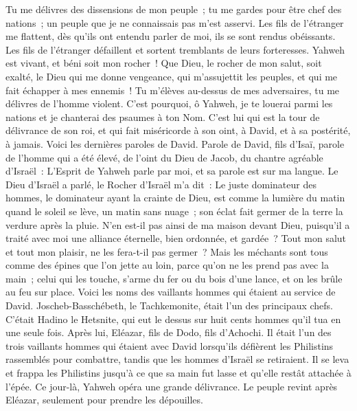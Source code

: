 \begin{multicols}{2}
Tu me délivres des dissensions de mon peuple~; tu me gardes pour être chef des nations~; un peuple que je ne connaissais pas m'est asservi.
Les fils de l'étranger me flattent, dès qu'ils ont entendu parler de moi, ils se sont rendus obéissants.
Les fils de l'étranger défaillent et sortent tremblants de leurs forteresses.
Yahweh est vivant, et béni soit mon rocher~! Que Dieu, le rocher de mon salut, soit exalté,
le Dieu qui me donne vengeance, qui m'assujettit les peuples,
et qui me fait échapper à mes ennemis~! Tu m'élèves au-dessus de mes adversaires, tu me délivres de l'homme violent.
C'est pourquoi, ô Yahweh, je te louerai parmi les nations et je chanterai des psaumes à ton Nom.
C'est lui qui est la tour de délivrance de son roi, et qui fait miséricorde à son oint, à David, et à sa postérité, à jamais.
\VerseOne{}Voici les dernières paroles de David. Parole de David, fils d'Isaï, parole de l'homme qui a été élevé, de l'oint du Dieu de Jacob, du chantre agréable d'Israël~:
L'Esprit de Yahweh parle par moi, et sa parole est sur ma langue.
Le Dieu d'Israël a parlé, le Rocher d'Israël m'a dit~: Le juste dominateur des hommes, le dominateur ayant la crainte de Dieu,
est comme la lumière du matin quand le soleil se lève, un matin sans nuage~; son éclat fait germer de la terre la verdure après la pluie.
N'en est-il pas ainsi de ma maison devant Dieu, puisqu'il a traité avec moi une alliance éternelle, bien ordonnée, et gardée~? Tout mon salut et tout mon plaisir, ne les fera-t-il pas germer~?
Mais les méchants sont tous comme des épines que l'on jette au loin, parce qu'on ne les prend pas avec la main~;
celui qui les touche, s'arme du fer ou du bois d'une lance, et on les brûle au feu sur place.
Voici les noms des vaillants hommes qui étaient au service de David. Joscheb-Basschébeth, le Tachkemonite, était l'un des principaux chefs. C'était Hadino le Hetsnite, qui eut le dessus sur huit cents hommes qu'il tua en une seule fois.
Après lui, Eléazar, fils de Dodo, fils d'Achochi. Il était l'un des trois vaillants hommes qui étaient avec David lorsqu'ils défièrent les Philistins rassemblés pour combattre, tandis que les hommes d'Israël se retiraient.
Il se leva et frappa les Philistins jusqu'à ce que sa main fut lasse et qu'elle restât attachée à l'épée. Ce jour-là, Yahweh opéra une grande délivrance. Le peuple revint après Eléazar, seulement pour prendre les dépouilles.

\end{multicols}
